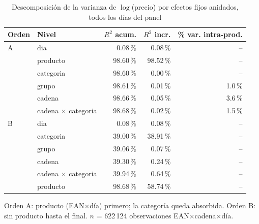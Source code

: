 \begin{table}[htbp]
\caption{Descomposici\'on de la varianza de $\log$(precio) por efectos fijos anidados, todos los d\'ias del panel}
\label{tab:varianza}
\centering\scriptsize\setlength{\tabcolsep}{3pt}
\begin{tabular}{@{}llrrr@{}}
\toprule
Orden & Nivel & $R^2$ acum. & $R^2$ incr. & \% var. intra-prod. \\
\midrule
A & dia & 0.08\,\% & 0.08\,\% & -- \\
 & producto & 98.60\,\% & 98.52\,\% & -- \\
 & categoria & 98.60\,\% & 0.00\,\% & -- \\
 & grupo & 98.61\,\% & 0.01\,\% & 1.0\,\% \\
 & cadena & 98.66\,\% & 0.05\,\% & 3.6\,\% \\
 & cadena $\times$ categoria & 98.68\,\% & 0.02\,\% & 1.5\,\% \\
\midrule
B & dia & 0.08\,\% & 0.08\,\% & -- \\
 & categoria & 39.00\,\% & 38.91\,\% & -- \\
 & grupo & 39.06\,\% & 0.07\,\% & -- \\
 & cadena & 39.30\,\% & 0.24\,\% & -- \\
 & cadena $\times$ categoria & 39.94\,\% & 0.64\,\% & -- \\
 & producto & 98.68\,\% & 58.74\,\% & -- \\
\bottomrule\end{tabular}
\par\smallskip\raggedright\scriptsize Orden A: producto (EAN$\times$d\'ia) primero; la categor\'ia queda absorbida. Orden B: sin producto hasta el final. $n$ = 622\,124 observaciones EAN$\times$cadena$\times$d\'ia.
\end{table}
